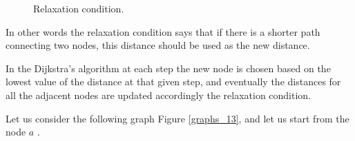 \begin{figure}[H]

\centering
{}

\caption[Relaxation condition.]{Relaxation condition.}
\label{graphs_12}
\end{figure}

In other words the relaxation condition says that if there is a shorter path connecting two nodes, this distance should be used as the new distance.

In the Dijkstra's algorithm at each step the new node is chosen based on the lowest value of the distance at that given step, and eventually the distances for all the adjacent nodes are updated accordingly the relaxation condition.

Let us consider the following graph Figure \ref{graphs_13}, and let us start from the node \(a\) \cite{dijkstraexplaination}.

